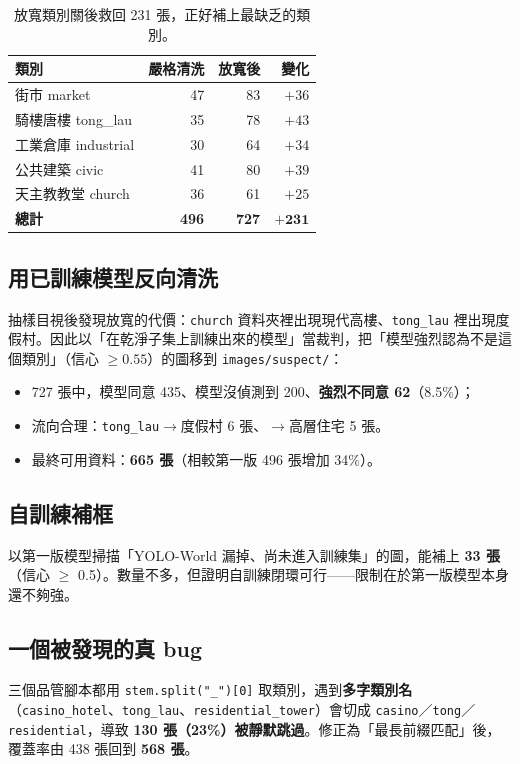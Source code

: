 \documentclass[11pt,a4paper,fontset=windows]{ctexart}
\begin{document}
\begin{table}[H]
\centering\small
\begin{tabular}{@{}lrrr@{}}
\toprule
\textbf{類別} & \textbf{嚴格清洗} & \textbf{放寬後} & \textbf{變化} \\
\midrule
街市 market & 47 & 83 & $+36$ \\
騎樓唐樓 tong\_lau & 35 & 78 & $+43$ \\
工業倉庫 industrial & 30 & 64 & $+34$ \\
公共建築 civic & 41 & 80 & $+39$ \\
天主教教堂 church & 36 & 61 & $+25$ \\
\midrule
\textbf{總計} & \textbf{496} & \textbf{727} & $\mathbf{+231}$ \\
\bottomrule
\end{tabular}
\caption{放寬類別關後救回 231 張，正好補上最缺乏的類別。}
\end{table}

\subsection{用已訓練模型反向清洗}
抽樣目視後發現放寬的代價：\texttt{church} 資料夾裡出現現代高樓、\texttt{tong\_lau} 裡出現度假村。因此以「在乾淨子集上訓練出來的模型」當裁判，把「模型強烈認為不是這個類別」（信心 $\ge 0.55$）的圖移到 \texttt{images/suspect/}：

\begin{itemize}[leftmargin=1.4em,itemsep=1pt]
  \item 727 張中，模型同意 435、模型沒偵測到 200、\textbf{強烈不同意 62}（8.5\%）；
  \item 流向合理：\texttt{tong\_lau}$\to$度假村 6 張、$\to$高層住宅 5 張。
  \item 最終可用資料：\textbf{665 張}（相較第一版 496 張增加 34\%）。
\end{itemize}

\subsection{自訓練補框}
以第一版模型掃描「YOLO-World 漏掉、尚未進入訓練集」的圖，能補上 \textbf{33 張}（信心 $\ge$ 0.5）。數量不多，但證明自訓練閉環可行——限制在於第一版模型本身還不夠強。

\subsection{一個被發現的真 bug}
三個品管腳本都用 \texttt{stem.split("\_")[0]} 取類別，遇到\textbf{多字類別名}（\texttt{casino\_hotel}、\texttt{tong\_lau}、\texttt{residential\_tower}）會切成 \texttt{casino}／\texttt{tong}／\texttt{residential}，導致 \textbf{130 張（23\%）被靜默跳過}。修正為「最長前綴匹配」後，覆蓋率由 438 張回到 \textbf{568 張}。
\end{document}
